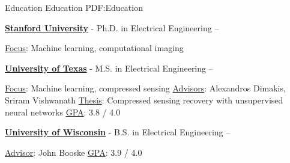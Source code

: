 \Section
{Education}
{Education}
{PDF:Education}

\Entry
\href{}{\textbf{Stanford University}} - Ph.D. in Electrical Engineering
\hfill
{} -- 

\begin{Detail}
\BulletItem
\underline{Focus}:
Machine learning, computational imaging%
\end{Detail}

\BigGap
\Entry
\href{}{\textbf{University of Texas}} - M.S. in Electrical Engineering
\hfill
{} -- 
\begin{Detail}
\BulletItem
\underline{Focus}:
Machine learning, compressed sensing
\BulletItem
\underline{Advisors}: Alexandros Dimakis, Sriram Vishwanath
\BulletItem
\underline{Thesis}:
Compressed sensing recovery with unsupervised neural networks
\BulletItem
\underline{GPA}: 3.8 / 4.0
\end{Detail}

\BigGap
\Entry
\href{}{\textbf{University of Wisconsin}} - B.S. in Electrical Engineering
\hfill
{} -- 
\begin{Detail}
\BulletItem
\underline{Advisor}: John Booske
\BulletItem
\underline{GPA}: 3.9 / 4.0
\end{Detail}